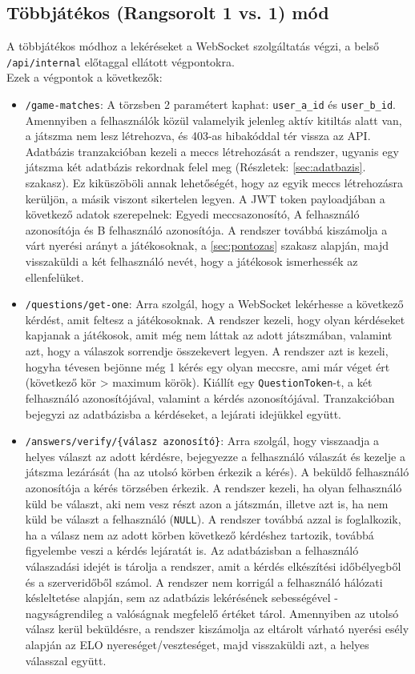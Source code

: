 \subsection{Többjátékos (Rangsorolt 1 vs. 1) mód}
A többjátékos módhoz a lekéréseket a WebSocket szolgáltatás végzi, a belső \texttt{/api/internal} előtaggal ellátott végpontokra. 
\\Ezek a végpontok a következők:
\begin{itemize}
    \item \texttt{/game-matches}: A törzsben 2 paramétert kaphat: \texttt{user\_a\_id} és \texttt{user\_b\_id}. Amennyiben a felhasználók közül valamelyik jelenleg aktív kitiltás alatt van, a játszma nem lesz létrehozva, és 403-as hibakóddal tér vissza az API. Adatbázis tranzakcióban kezeli a meccs létrehozását a rendszer, ugyanis egy játszma két adatbázis rekordnak felel meg (Részletek: \ref{sec:adatbazis}. szakasz). Ez kiküszöböli annak lehetőségét, hogy az egyik meccs létrehozásra kerüljön, a másik viszont sikertelen legyen. A JWT token payloadjában a következő adatok szerepelnek: Egyedi meccsazonosító, A felhasználó azonosítója és B felhasználó azonosítója. A rendszer továbbá kiszámolja a várt nyerési arányt a játékosoknak, a \ref{sec:pontozas} szakasz alapján, majd visszaküldi a két felhasználó nevét, hogy a játékosok ismerhessék az ellenfelüket.
    \item \texttt{/questions/get-one}: Arra szolgál, hogy a WebSocket lekérhesse a következő kérdést, amit feltesz a játékosoknak. A rendszer kezeli, hogy olyan kérdéseket kapjanak a játékosok, amit még nem láttak az adott játszmában, valamint azt, hogy a válaszok sorrendje összekevert legyen. A rendszer azt is kezeli, hogyha tévesen bejönne még 1 kérés egy olyan meccsre, ami már véget ért (következő kör > maximum körök). Kiállít egy \texttt{QuestionToken}-t, a két felhasználó azonosítójával, valamint a kérdés azonosítójával.  Tranzakcióban bejegyzi az adatbázisba a kérdéseket, a lejárati idejükkel együtt.
    \item \texttt{/answers/verify/\{válasz azonosító\}}: Arra szolgál, hogy visszaadja a helyes választ az adott kérdésre, bejegyezze a felhasználó válaszát és kezelje a játszma lezárását (ha az utolsó körben érkezik a kérés). A beküldő felhasználó azonosítója a kérés törzsében érkezik. A rendszer kezeli, ha olyan felhasználó küld be választ, aki nem vesz részt azon a játszmán, illetve azt is, ha nem küld be választ a felhasználó (\texttt{NULL}). A rendszer továbbá azzal is foglalkozik, ha a válasz nem az adott körben következő kérdéshez tartozik, továbbá figyelembe veszi a kérdés lejáratát is. Az adatbázisban a felhasználó válaszadási idejét is tárolja a rendszer, amit a kérdés elkészítési időbélyegből és a szerveridőből számol. A rendszer nem korrigál a felhasználó hálózati késleltetése alapján, sem az adatbázis lekérésének sebességével - nagyságrendileg a valóságnak megfelelő értéket tárol. Amennyiben az utolsó válasz kerül beküldésre, a rendszer kiszámolja az eltárolt várható nyerési esély alapján az ELO nyereséget/veszteséget, majd visszaküldi azt, a helyes válasszal együtt.
\end{itemize}
